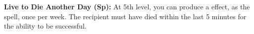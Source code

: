 {\textbf{Live to Die Another Day (Sp):} At 5th level, you can produce a  effect, as the spell, once per week. The recipient must have died within the last 5 minutes for the ability to be successful.
}

